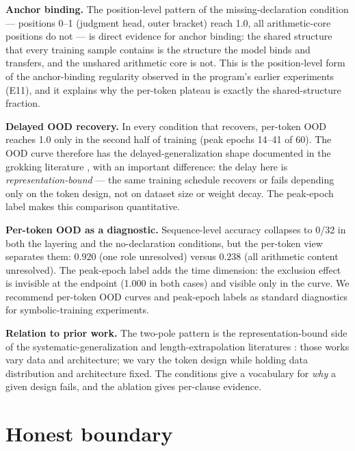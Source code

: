 \documentclass{article} %
\begin{document}
\textbf{Anchor binding.} The position-level pattern of the
missing-declaration condition --- positions 0--1 (judgment head,
outer bracket) reach 1.0, all arithmetic-core positions do not ---
is direct evidence for anchor binding: the shared structure that
every training sample contains is the structure the model binds
and transfers, and the unshared arithmetic core is not. This is
the position-level form of the anchor-binding regularity observed
in the program's earlier experiments (E11), and it explains why
the per-token plateau is exactly the shared-structure fraction.

\textbf{Delayed OOD recovery.} In every condition that
recovers, per-token OOD reaches 1.0 only in the second half of
training (peak epochs 14--41 of 60). The OOD curve therefore has
the delayed-generalization shape documented in the grokking
literature \citep{power2022grokking}, with an important
difference: the delay here is \emph{representation-bound} --- the
same training schedule recovers or fails depending only on the
token design, not on dataset size or weight decay. The peak-epoch
label makes this comparison quantitative.

\textbf{Per-token OOD as a diagnostic.} Sequence-level accuracy
collapses to 0/32 in both the layering and the no-declaration
conditions, but the per-token view separates them: $0.920$ (one
role unresolved) versus $0.238$ (all arithmetic content
unresolved). The peak-epoch label adds the time dimension: the
exclusion effect is invisible at the endpoint (1.000 in both cases)
and visible only in the curve. We recommend per-token OOD curves
and peak-epoch labels as standard diagnostics for symbolic-training
experiments.

\textbf{Relation to prior work.} The two-pole pattern is the
representation-bound side of the systematic-generalization and
length-extrapolation literatures
\citep{lake2018generalization, keysers2020measuring,
hupkes2020compositionality, bahdanau2019systematic, anil2022exploring,
jelassi2023length, raffel2020exploring, zhou2021open,
qiu2020pretrained}: those works vary data and architecture; we vary
the token design while holding data distribution and architecture
fixed. The conditions give a vocabulary for \emph{why} a given
design fails, and the ablation gives per-clause evidence.

\section{Honest boundary}
\end{document}
